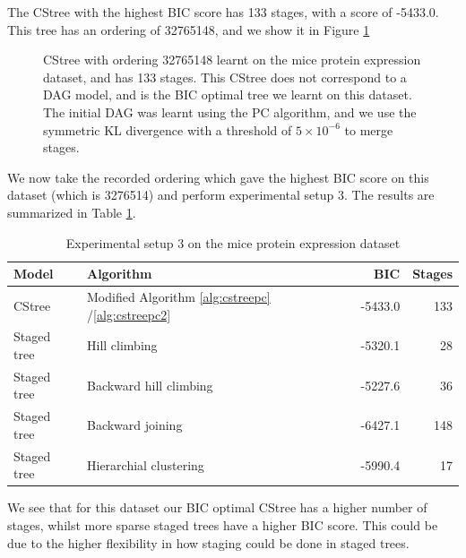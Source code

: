 \documentclass{tufte-book}
\begin{document}
The CStree with the highest BIC score has 133 stages, with a score of -5433.0. This tree has an ordering of 32765148, and we show it in Figure \ref{fig:micemaxbic}
\begin{figure}[!h]\label{fig:micemaxbic}
   \begin{floatrow}
%
\caption{CStree with ordering 32765148 learnt on the mice protein expression dataset, and has 133 stages. This CStree does not correspond to a DAG model, and is the BIC optimal tree we learnt on this dataset. The initial DAG was learnt using the PC algorithm, and we use the symmetric KL divergence with a threshold of $5\times 10^{-6}$ to merge stages.}
        
   \end{floatrow}
\end{figure}

We now take the recorded ordering which gave the highest BIC score on this dataset (which is 3276514) and perform experimental setup 3. The results are summarized in Table \ref{tab:orge27d230}.

\begin{table}[htbp]
\caption{\label{tab:orge27d230}Experimental setup 3 on the mice protein expression dataset}
\centering
\begin{tabular}{l|l|r|r}
\hline
Model & Algorithm & BIC & Stages\\
\hline
CStree & Modified Algorithm \ref{alg:cstreepc} /\ref{alg:cstreepc2} & -5433.0 & 133\\
Staged tree & Hill climbing & -5320.1 & 28\\
Staged tree & Backward hill climbing & -5227.6 & 36\\
Staged tree & Backward joining & -6427.1 & 148\\
Staged tree & Hierarchial clustering & -5990.4 & 17\\
\end{tabular}
\end{table}

We see that for this dataset our BIC optimal CStree has a higher number of stages, whilst more sparse staged trees have a higher BIC score. This could be due to the higher flexibility in how staging could be done in staged trees.
\end{document}
